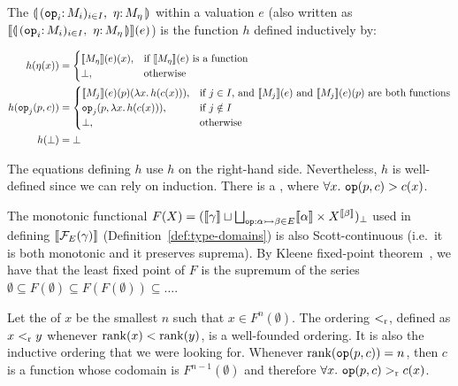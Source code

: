 \begin{definition}\label{def:banana-denotation}
  The  $\cibanana$ within a valuation
  $e$ (also written as $\sem{\cibanana}(e)$) is the function $h$ defined
  inductively by:

  \begin{align*}
    h(\eta(x)) &= \begin{cases}
      \llbracket M_\eta \rrbracket(e)(x), & \text{if $\llbracket M_\eta \rrbracket(e)$ is a function} \\
      \bot, & \text{otherwise} \\
    \end{cases} \\
    h(\mathtt{op}_j(p, c)) &= \begin{cases} 
      \llbracket M_j \rrbracket(e)(p)(\lambda x.\, h(c(x))), & \text{if $j \in I$, and $\llbracket M_j \rrbracket(e)$ and $\llbracket M_j \rrbracket(e)(p)$ are both functions} \\
      \mathtt{op}_j(p, \lambda x.\, h(c(x))), & \text{if $j \notin I$} \\
      \bot, & \text{otherwise} \\
    \end{cases} \\
    h(\bot) &= \bot
  \end{align*}
  
  The equations defining $h$ use $h$ on the right-hand side. Nevertheless,
  $h$ is well-defined since we can rely on induction. There is a
  ,
  where $\forall x.\ \mathtt{op}(p, c) > c(x)$.

  The monotonic functional
  $F(X) = (\llbracket \gamma \rrbracket \sqcup \bigsqcup_{\mathtt{op} : \alpha \rightarrowtail \beta \in
    E} \llbracket \alpha \rrbracket \times X^{\llbracket \beta \rrbracket})_\bot$ used in defining
  $\llbracket \mathcal{F}_E(\gamma) \rrbracket$ (Definition~\ref{def:type-domains}) is also
  Scott-continuous (i.e.\ it is both monotonic and it preserves
  suprema). By Kleene fixed-point theorem~\cite{kleene1952introduction}, we
  have that the least fixed point of $F$ is the supremum of the series
  $\emptyset \subseteq F(\emptyset) \subseteq F(F(\emptyset)) \subseteq
  \ldots$.

  Let the  of $x$ be the smallest $n$ such that
  $x \in F^n(\emptyset)$. The ordering $<_{\mathrm{r}}$, defined as
  $x <_{\mathrm{r}} y$ whenever $\operatorname{rank}(x) < \operatorname{rank}(y)$, is a well-founded
  ordering. It is also the inductive ordering that we were looking
  for. Whenever $\operatorname{rank}(\mathtt{op}(p, c)) = n$, then $c$ is a function whose
  codomain is $F^{n-1}(\emptyset)$ and therefore
  $\forall x.\ \mathtt{op}(p, c) >_{\mathrm{r}} c(x)$.
\end{definition}

